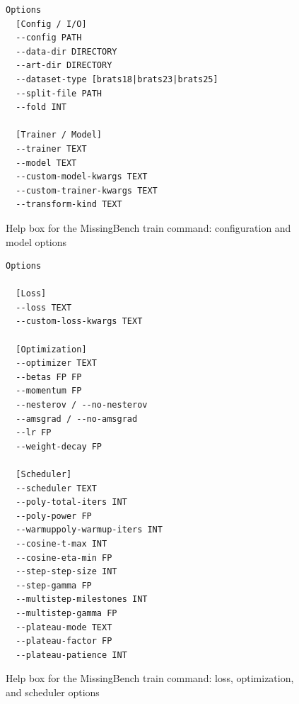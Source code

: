 \documentclass{article}
\begin{document}
\begin{figure}[h]
\centering
\begin{tcolorbox}[
  colback=lightgreenbg,
  colframe=lightgreenframe,
  arc=2mm,
  boxrule=0.6pt,
  title=MissingBench train: config and model,
  fonttitle=\bfseries
]
\begin{Verbatim}[breaklines=true,breakanywhere=true,fontsize=\small]
Options
  [Config / I/O]
  --config PATH
  --data-dir DIRECTORY
  --art-dir DIRECTORY
  --dataset-type [brats18|brats23|brats25]
  --split-file PATH
  --fold INT

  [Trainer / Model]
  --trainer TEXT
  --model TEXT
  --custom-model-kwargs TEXT
  --custom-trainer-kwargs TEXT
  --transform-kind TEXT
\end{Verbatim}
\end{tcolorbox}
\caption{Help box for the MissingBench train command: configuration and model options}
\label{fig:missingbench_train_config_model}
\end{figure}

\begin{figure}[h]
\centering
\begin{tcolorbox}[
  colback=lightgreenbg,
  colframe=lightgreenframe,
  arc=2mm,
  boxrule=0.6pt,
  title=MissingBench train: loss and optimization,
  fonttitle=\bfseries
]
\begin{Verbatim}[breaklines=true,breakanywhere=true,fontsize=\small]
Options

  [Loss]
  --loss TEXT
  --custom-loss-kwargs TEXT

  [Optimization]
  --optimizer TEXT
  --betas FP FP
  --momentum FP
  --nesterov / --no-nesterov
  --amsgrad / --no-amsgrad
  --lr FP
  --weight-decay FP

  [Scheduler]
  --scheduler TEXT
  --poly-total-iters INT
  --poly-power FP
  --warmuppoly-warmup-iters INT
  --cosine-t-max INT
  --cosine-eta-min FP
  --step-step-size INT
  --step-gamma FP
  --multistep-milestones INT
  --multistep-gamma FP
  --plateau-mode TEXT
  --plateau-factor FP
  --plateau-patience INT
\end{Verbatim}
\end{tcolorbox}
\caption{Help box for the MissingBench train command: loss, optimization, and scheduler options}
\label{fig:missingbench_train_optimization}
\end{figure}
\end{document}
